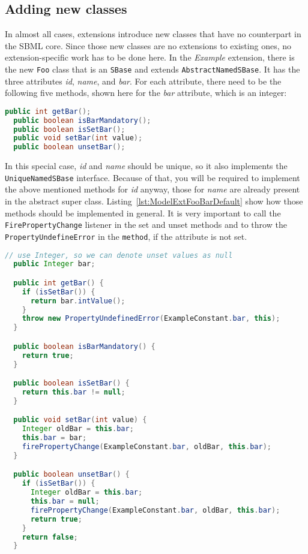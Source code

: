 \subsection{Adding new classes}
\label{subsec:addingClasses}
In almost all cases, extensions introduce new classes that have no counterpart in the SBML core.
Since those new classes are no extensions to existing ones, no extension-specific work has to be done here.
In the \emph{Example} extension, there is the new \texttt{Foo} class that is an \texttt{SBase} and extends \texttt{AbstractNamedSBase}.
It has the three attributes \emph{id}, \emph{name}, and \emph{bar}.
For each attribute, there need to be the following five methods, shown here for the \emph{bar} attribute, which is an integer:
\begin{lstlisting}[language=Java,float,caption={Five necessary methods that should be created for each \texttt{Foo} class attribute},label={lst:ModelExtFooBar}]
  public int getBar();
  public boolean isBarMandatory();
  public boolean isSetBar();
  public void setBar(int value);
  public boolean unsetBar();
\end{lstlisting}

In this special case, \emph{id} and \emph{name} should be unique, so it also implements the \texttt{UniqueNamedSBase} interface.
Because of that, you will be required to implement the above mentioned methods for \emph{id} anyway, those for \emph{name} are already present in the abstract super class.
Listing~\vref{lst:ModelExtFooBarDefault} show how those methods should be implemented in general. It is very important to call the \texttt{FirePropertyChange} listener in the set and unset methods and to throw the \texttt{PropertyUndefineError} in the \texttt{method}, if the attribute is not set.

\begin{lstlisting}[language=Java,caption={Five necessary methods that should be created for each \texttt{Foo} class attribute in detail},label={lst:ModelExtFooBarDefault}]
  // use Integer, so we can denote unset values as null
  public Integer bar;

  public int getBar() {
    if (isSetBar()) {
      return bar.intValue();
    }
    throw new PropertyUndefinedError(ExampleConstant.bar, this);
  }

  public boolean isBarMandatory() {
    return true;
  }

  public boolean isSetBar() {
    return this.bar != null;
  }

  public void setBar(int value) {
    Integer oldBar = this.bar;
    this.bar = bar;
    firePropertyChange(ExampleConstant.bar, oldBar, this.bar);
  }

  public boolean unsetBar() {
    if (isSetBar()) {
      Integer oldBar = this.bar;
      this.bar = null;
      firePropertyChange(ExampleConstant.bar, oldBar, this.bar);
      return true;
    }
    return false;
  }
\end{lstlisting}

